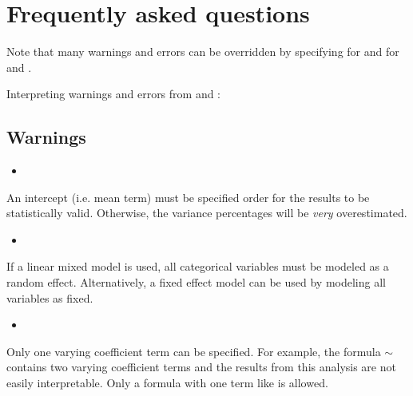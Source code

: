 \documentclass[12pt]{article}\usepackage[]{graphicx}\usepackage[]{xcolor}
\begin{document}
\section{Frequently asked questions}

Note that many warnings and errors can be overridden by specifying \newline {} for  and  for \newline{} and .

Interpreting warnings and errors from  and :

\subsection{Warnings}

\begin{itemize}
  \item {}
\end{itemize}
An intercept (i.e. mean term) must be specified order for the results to be statistically valid.  Otherwise, the variance percentages will be {\it very} overestimated.\\

\begin{itemize}
  \item {}
\end{itemize}
If a linear mixed model is used, all categorical variables must be modeled as a random effect.  Alternatively, a fixed effect model can be used by modeling all variables as fixed. \\ 

\begin{itemize}
  \item {}
\end{itemize}
Only one varying coefficient term can be specified.  For example, the formula $\sim$ contains two varying coefficient terms and the results from this analysis are not easily interpretable.  Only a formula with one term like  is allowed. \\ 
\end{document}
